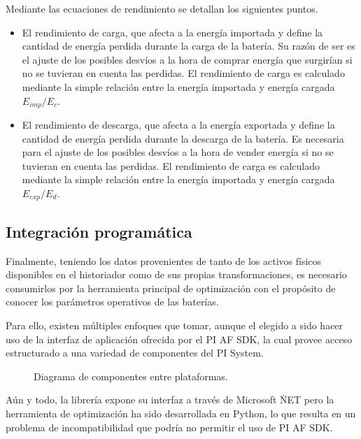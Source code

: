 Mediante las ecuaciones de rendimiento se detallan los siguientes puntos.

\begin{itemize}

  \item El rendimiento de carga, que afecta a la energía importada y define la cantidad de energía perdida durante la carga de la batería. Su razón de ser es el ajuste de los posibles desvíos a la hora de comprar energía que surgirían si no se tuvieran en cuenta las perdidas. El rendimiento de carga es calculado mediante la simple relación entre la energía importada y energía cargada \( E_{imp} / E_c \).

  \item El rendimiento de descarga, que afecta a la energía exportada y define la cantidad de energía perdida durante la descarga de la batería. Es necesaria para el ajuste de los posibles desvíos a la hora de vender energía si no se tuvieran en cuenta las perdidas. El rendimiento de carga es calculado mediante la simple relación entre la energía importada y energía cargada \( E_{exp} / E_d \).

\end{itemize}

\subsection{Integración programática}
\label{makereference3.5.2}

Finalmente, teniendo los datos provenientes de tanto de los activos físicos disponibles en el historiador como de sus propias transformaciones, es necesario consumirlos por la herramienta principal de optimización con el propósito de conocer los parámetros operativos de las baterías.

Para ello, existen múltiples enfoques que tomar, aunque el elegido a sido hacer uso de la interfaz de aplicación ofrecida por el PI AF SDK, la cual provee acceso estructurado a una variedad de componentes del PI System.

\begin{figure}
  \centering
  \caption[Diagrama de componentes entre plataformas.]{Diagrama de componentes entre plataformas.}
  \label{fig:integración-programatica}
\end{figure}

Aún y todo, la librería expone su interfaz a través de Microsoft \.NET pero la herramienta de optimización ha sido desarrollada en Python, lo que resulta en un problema de incompatibilidad que podría no permitir el uso de PI AF SDK\@.

